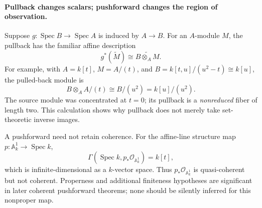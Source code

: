 \paragraph{Pullback changes scalars; pushforward changes the region of observation.}
Suppose \(g:\operatorname{Spec}B\to\operatorname{Spec}A\) is induced
by \(A\to B\). For an \(A\)-module \(M\), the pullback has the
familiar affine description
\[
 g^*(\widetilde M)\cong\widetilde{B\otimes_A M}.
\]
For example, with \(A=k[t]\), \(M=A/(t)\), and
\(B=k[t,u]/(u^2-t)\cong k[u]\), the pulled-back module is
\[
 B\otimes_A A/(t)\cong B/(u^2)=k[u]/(u^2).
\]
The source module was concentrated at \(t=0\); its pullback is a
\emph{nonreduced} fiber of length two. This calculation shows why
pullback does not merely take set-theoretic inverse images.

A pushforward need not retain coherence. For the affine-line structure
map \(p:\mathbb A^1_k\to\operatorname{Spec}k\),
\[
 \Gamma(\operatorname{Spec}k,p_*\mathcal O_{\mathbb A^1_k})
     =k[t],
\]
which is infinite-dimensional as a \(k\)-vector space. Thus
\(p_*\mathcal O_{\mathbb A^1_k}\) is quasi-coherent but not coherent.
Properness and additional finiteness hypotheses are significant in
later coherent pushforward theorems; none should be silently inferred
for this nonproper map.
